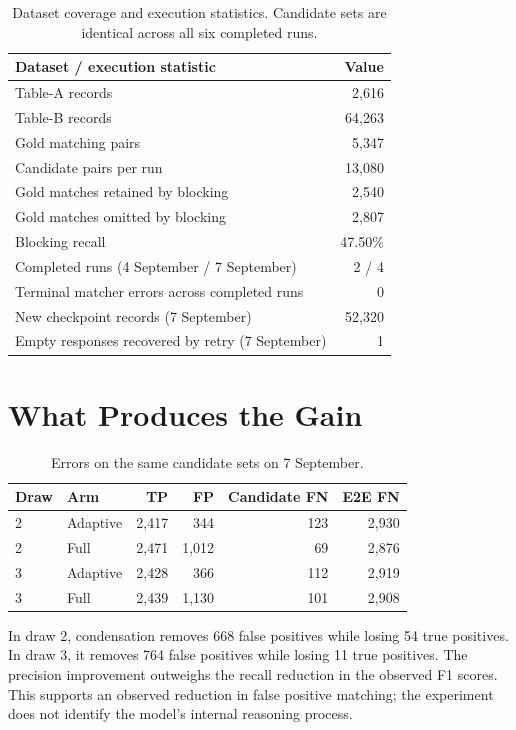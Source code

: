 \documentclass[11pt]{article}
\begin{document}
\begin{table}[H]
\centering\small
\begin{tabular}{lr}
\toprule
Dataset / execution statistic & Value \\
\midrule
Table-A records & 2,616 \\
Table-B records & 64,263 \\
Gold matching pairs & 5,347 \\
Candidate pairs per run & 13,080 \\
Gold matches retained by blocking & 2,540 \\
Gold matches omitted by blocking & 2,807 \\
Blocking recall & 47.50\% \\
Completed runs (4 September / 7 September) & 2 / 4 \\
Terminal matcher errors across completed runs & 0 \\
New checkpoint records (7 September) & 52,320 \\
Empty responses recovered by retry (7 September) & 1 \\
\bottomrule
\end{tabular}
\caption{Dataset coverage and execution statistics. Candidate sets are identical
across all six completed runs.}
\end{table}

\section{What Produces the Gain}
\begin{table}[H]
\centering\small
\begin{tabular}{llrrrr}
\toprule
Draw & Arm & TP & FP & Candidate FN & E2E FN \\
\midrule
2 & Adaptive & 2,417 & 344 & 123 & 2,930 \\
2 & Full & 2,471 & 1,012 & 69 & 2,876 \\
3 & Adaptive & 2,428 & 366 & 112 & 2,919 \\
3 & Full & 2,439 & 1,130 & 101 & 2,908 \\
\bottomrule
\end{tabular}
\caption{Errors on the same candidate sets on 7 September.}
\end{table}

In draw 2, condensation removes 668 false positives while losing 54 true positives.
In draw 3, it removes 764 false positives while losing 11 true positives. The
precision improvement outweighs the recall reduction in the observed F1 scores.
This supports an observed reduction in false positive matching; the experiment
does not identify the model's internal reasoning process.
\end{document}
